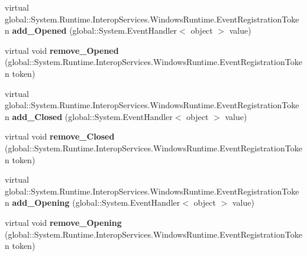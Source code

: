 \begin{DoxyCompactItemize}
virtual global\+::\+System.\+Runtime.\+Interop\+Services.\+Windows\+Runtime.\+Event\+Registration\+Token {\bfseries add\+\_\+\+Opened} (global\+::\+System.\+Event\+Handler$<$ object $>$ value)
\item 
\mbox{\label{class_windows_1_1_u_i_1_1_xaml_1_1_controls_1_1_primitives_1_1_flyout_base_a4bd2f94eb6ae77227752ea52d9497eb1}} 
virtual void {\bfseries remove\+\_\+\+Opened} (global\+::\+System.\+Runtime.\+Interop\+Services.\+Windows\+Runtime.\+Event\+Registration\+Token token)
\item 
\mbox{\label{class_windows_1_1_u_i_1_1_xaml_1_1_controls_1_1_primitives_1_1_flyout_base_a5f48a350689b2ef057ac2a870cfbbc9f}} 
virtual global\+::\+System.\+Runtime.\+Interop\+Services.\+Windows\+Runtime.\+Event\+Registration\+Token {\bfseries add\+\_\+\+Closed} (global\+::\+System.\+Event\+Handler$<$ object $>$ value)
\item 
\mbox{\label{class_windows_1_1_u_i_1_1_xaml_1_1_controls_1_1_primitives_1_1_flyout_base_a910f4919b18377849ddf436963142092}} 
virtual void {\bfseries remove\+\_\+\+Closed} (global\+::\+System.\+Runtime.\+Interop\+Services.\+Windows\+Runtime.\+Event\+Registration\+Token token)
\item 
\mbox{\label{class_windows_1_1_u_i_1_1_xaml_1_1_controls_1_1_primitives_1_1_flyout_base_a8dbfb4d3df5e017a006229b035558c61}} 
virtual global\+::\+System.\+Runtime.\+Interop\+Services.\+Windows\+Runtime.\+Event\+Registration\+Token {\bfseries add\+\_\+\+Opening} (global\+::\+System.\+Event\+Handler$<$ object $>$ value)
\item 
\mbox{\label{class_windows_1_1_u_i_1_1_xaml_1_1_controls_1_1_primitives_1_1_flyout_base_a24e892a50720e9b950a86332383a641c}} 
virtual void {\bfseries remove\+\_\+\+Opening} (global\+::\+System.\+Runtime.\+Interop\+Services.\+Windows\+Runtime.\+Event\+Registration\+Token token)
\item 
\mbox{\label{class_windows_1_1_u_i_1_1_xaml_1_1_controls_1_1_primitives_1_1_flyout_base_a048b76cc08a938c4371b9bc74777d73a}} 

\end{DoxyCompactItemize}

